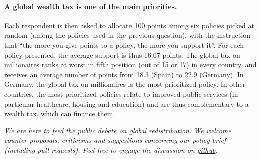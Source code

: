 \documentclass[12pt,english]{article}
\begin{document}


\paragraph{A global wealth tax is one of the main priorities.} Each respondent is then asked to allocate 100 points among six policies picked at random (among the policies used in the previous question), with the instruction that ``the more you give points to a policy, the more you support it''. For each policy presented, the average support is thus 16.67 points.  The global tax on millionaires ranks at worst in fifth position (out of 15 or 17) in every country, and receives an average number of points from 18.3 (Spain) to 22.9 (Germany). 
In Germany, the global tax on millionaires is the most prioritized policy. In other countries, the most prioritized policies relate to improved public services (in particular healthcare, housing and education) and are thus complementary to a wealth tax, which can finance them.
\quad \\ \quad 

\textit{We are here to feed the public debate on global redistribution. We welcome counter-proposals, criticisms and suggestions concerning our policy brief (including pull requests). Feel free to engage the discussion on \href{https://github.com/bixiou/global_tax_attitudes/issues}{github}. }
\end{document}
